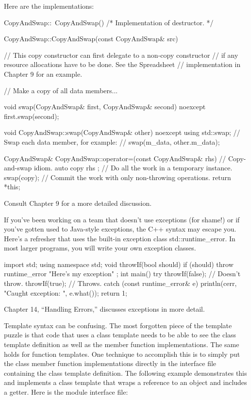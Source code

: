 Here are the implementations:

\begin{cpp}
CopyAndSwap::~CopyAndSwap() { /* Implementation of destructor. */ }

CopyAndSwap::CopyAndSwap(const CopyAndSwap& src)
{
    // This copy constructor can first delegate to a non-copy constructor
    // if any resource allocations have to be done. See the Spreadsheet
    // implementation in Chapter 9 for an example.

    // Make a copy of all data members...
}

void swap(CopyAndSwap& first, CopyAndSwap& second) noexcept
{
    first.swap(second);
}

void CopyAndSwap::swap(CopyAndSwap& other) noexcept
{
    using std::swap;
    // Swap each data member, for example:
    // swap(m_data, other.m_data);
}

CopyAndSwap& CopyAndSwap::operator=(const CopyAndSwap& rhs)
{
    // Copy-and-swap idiom.
    auto copy { rhs }; // Do all the work in a temporary instance.
    swap(copy); // Commit the work with only non-throwing operations.
    return *this;
}
\end{cpp}

Consult Chapter 9 for a more detailed discussion.


If you’ve been working on a team that doesn’t use exceptions (for shame!) or if you’ve gotten used to Java-style exceptions, the C++ syntax may escape you. Here’s a refresher that uses the built-in exception class std::runtime\_error. In most larger programs, you will write your own exception classes.

\begin{cpp}
import std;
using namespace std;
void throwIf(bool should)
{
    if (should) {
        throw runtime_error { "Here's my exception" };
    }
}
int main()
{
    try {
        throwIf(false); // Doesn't throw.
        throwIf(true); // Throws.
    } catch (const runtime_error& e) {
        println(cerr, "Caught exception: {}", e.what());
        return 1;
    }
}
\end{cpp}

Chapter 14, “Handling Errors,” discusses exceptions in more detail.


Template syntax can be confusing. The most forgotten piece of the template puzzle is that code that uses a class template needs to be able to see the class template definition as well as the member function implementations. The same holds for function templates. One technique to accomplish this is to simply put the class member function implementations directly in the interface file containing the class template definition. The following example demonstrates this and implements a class template that wraps a reference to an object and includes a getter. Here is the module interface file:

